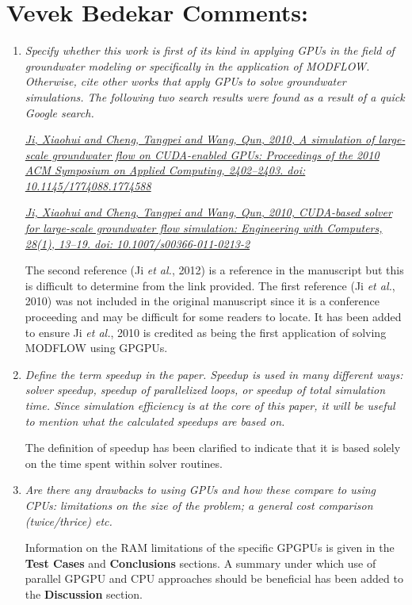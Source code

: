 \documentclass[12pt]{article} %
\begin{document}
\section*{Vevek Bedekar Comments:}
\begin{enumerate}
\item \textit{Specify whether this work is first of its kind in applying GPUs in the field of groundwater modeling or specifically in the application of MODFLOW. Otherwise, cite other works that apply GPUs to solve groundwater simulations. The following two search results were found as a result of a quick Google search.} 

\textit{\href{http://doi.acm.org/10.1145/1774088.1774588}{Ji, Xiaohui and Cheng, Tangpei and Wang, Qun, 2010, A simulation of large-scale groundwater flow on CUDA-enabled GPUs: Proceedings of the 2010 ACM Symposium on Applied Computing, 2402--2403. doi: 10.1145/1774088.1774588}}

\textit{\href{http://www.gpucomputing.net/?q=node/14182}{Ji, Xiaohui and Cheng, Tangpei and Wang, Qun, 2010, CUDA-based solver for large-scale groundwater flow simulation: Engineering with Computers, 28(1), 13--19. doi: 10.1007/s00366-011-0213-2}}

The second reference (Ji \textit{et al.}, 2012) is a reference in the manuscript but this is difficult to determine from the link provided. The first reference (Ji \textit{et al.}, 2010) was not included in the original manuscript since it is a conference proceeding and may be difficult for some readers to locate. It has been added to ensure Ji \textit{et al.}, 2010 is credited as being the first application of solving MODFLOW using GPGPUs. 

\item \textit{Define the term speedup in the paper. Speedup is used in many different ways: solver speedup, speedup of parallelized loops, or speedup of total simulation time. Since simulation efficiency is at the core of this paper, it will be useful to mention what the calculated speedups are based on.}

The definition of speedup has been clarified to indicate that it is based solely on the time spent within solver routines.

\item \textit{Are there any drawbacks to using GPUs and how these compare to using CPUs: limitations on the size of the problem; a general cost comparison (twice/thrice) etc.}

Information on the RAM limitations of the specific GPGPUs is given in the \textbf{Test Cases} and \textbf{Conclusions} sections. A summary under which use of parallel GPGPU and CPU approaches should be beneficial has been added to the \textbf{Discussion} section. 


\end{enumerate}
\end{document}

